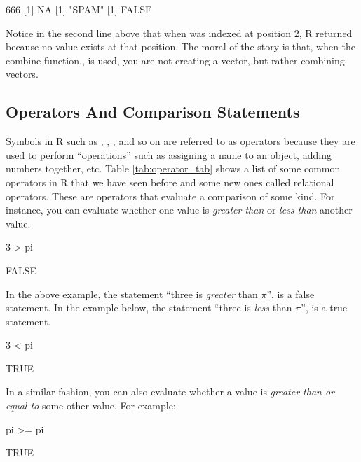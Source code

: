 \begin{outR}
[1] 666
[1] NA
[1] "SPAM"
[1] FALSE
\end{outR}

Notice in the second line above that when  was indexed at position 2, R returned  because no value exists at that position. The moral of the story is that, when the combine function,, is used, you are not creating a vector, but rather combining vectors.


\subsection{Operators And Comparison Statements}
\label{sec:operatorsAndCompair}

Symbols in R such as \R{<-}, \R{+}, \R{-}, and so on are referred to as operators because they are used to perform ``operations'' such as assigning a name to an object, adding numbers together, etc.  Table \ref{tab:operator_tab} shows a list of some common operators in R that we have seen before and some new ones called \glspl{relational operator}.  These are operators that evaluate a comparison of some kind.  For instance, you can evaluate whether one value is \textit{greater than} or \textit{less than} another value.

%

\begin{inR}
3 > pi
\end{inR}
\begin{outR}
[1] FALSE
\end{outR}

\noindent
In the above example, the statement ``three is \textit{greater} than $\pi$'', is a false statement.  In the example below, the statement ``three is \textit{less} than $\pi$'', is a true statement.

\begin{inR}
3 < pi
\end{inR}
\begin{outR}
[1] TRUE
\end{outR}

\noindent
In a similar fashion, you can also evaluate whether a value is \textit{greater than or equal to} some other value. For example:

\begin{inR}
pi >= pi
\end{inR}
\begin{outR}
[1] TRUE
\end{outR}

